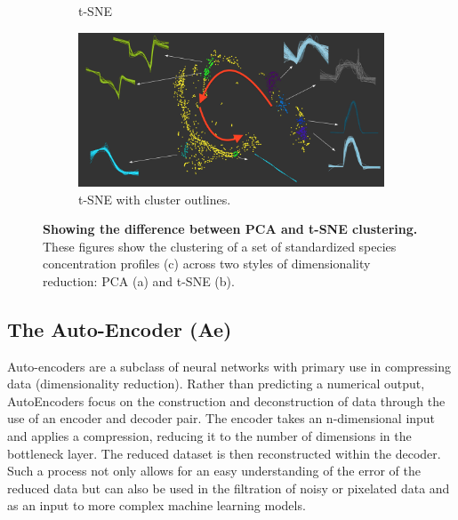 \begin{figure}[H]
\begin{subfigure}[b]{0.495\textwidth}
         \caption{t-SNE}
         \label{fig:tsnec}
     \end{subfigure}
     \hfill \hfill
     \begin{subfigure}[b]{\textwidth}
         \centering
         \includegraphics[width=\textwidth]{4fig/ptsneall.png}
         \caption{t-SNE with cluster outlines.}
         \label{fig:tco}
     \end{subfigure}
        \caption{\textbf{Showing the difference between PCA and t-SNE clustering.} These figures show the clustering of a set of standardized species concentration profiles (c) across two styles of dimensionality reduction: PCA (a) and t-SNE (b). }
        \label{fig:threegraphs}
\end{figure}




\subsection{The Auto-Encoder (Ae)}\label{sec:ae}
Auto-encoders are a subclass of neural networks with primary use in compressing data (dimensionality reduction). Rather than predicting a numerical output, AutoEncoders focus on the construction and deconstruction of data through the use of an encoder and decoder pair. The encoder takes an n-dimensional input and applies a compression, reducing it to the number of dimensions in the bottleneck layer. The reduced dataset is then reconstructed within the decoder. Such a process not only allows for an easy understanding of the error of the reduced data but can also be used in the filtration of noisy or pixelated data \citep{aenoise,aeim} and as an input to more complex machine learning models.\


